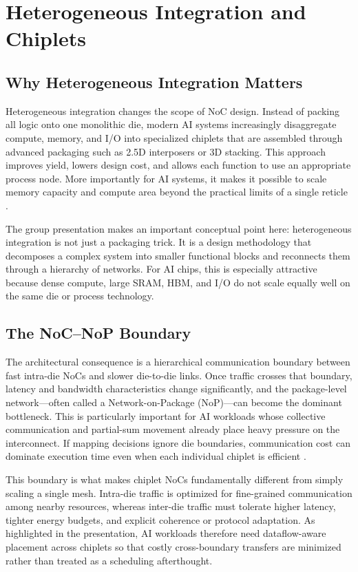 \section{Heterogeneous Integration and Chiplets}
\label{sec:chiplet}

\subsection{Why Heterogeneous Integration Matters}

Heterogeneous integration changes the scope of NoC design. Instead of packing all logic onto one monolithic die, modern AI systems increasingly disaggregate compute, memory, and I/O into specialized chiplets that are assembled through advanced packaging such as 2.5D interposers or 3D stacking. This approach improves yield, lowers design cost, and allows each function to use an appropriate process node. More importantly for AI systems, it makes it possible to scale memory capacity and compute area beyond the practical limits of a single reticle \cite{yin2024review,ucie2024spec}.

The group presentation makes an important conceptual point here: heterogeneous integration is not just a packaging trick. It is a design methodology that decomposes a complex system into smaller functional blocks and reconnects them through a hierarchy of networks. For AI chips, this is especially attractive because dense compute, large SRAM, HBM, and I/O do not scale equally well on the same die or process technology.

\subsection{The NoC--NoP Boundary}

The architectural consequence is a hierarchical communication boundary between fast intra-die NoCs and slower die-to-die links. Once traffic crosses that boundary, latency and bandwidth characteristics change significantly, and the package-level network---often called a Network-on-Package (NoP)---can become the dominant bottleneck. This is particularly important for AI workloads whose collective communication and partial-sum movement already place heavy pressure on the interconnect. If mapping decisions ignore die boundaries, communication cost can dominate execution time even when each individual chiplet is efficient \cite{shao2019simba,sharma2022swap}.

This boundary is what makes chiplet NoCs fundamentally different from simply scaling a single mesh. Intra-die traffic is optimized for fine-grained communication among nearby resources, whereas inter-die traffic must tolerate higher latency, tighter energy budgets, and explicit coherence or protocol adaptation. As highlighted in the presentation, AI workloads therefore need dataflow-aware placement across chiplets so that costly cross-boundary transfers are minimized rather than treated as a scheduling afterthought.

